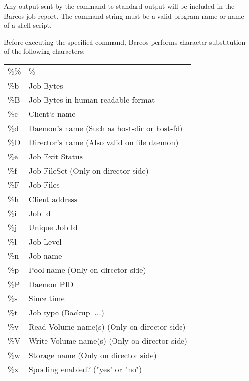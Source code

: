 {Any output sent by the command to standard output will be included in the
Bareos job report.  The command string must be a valid program name or name
of a shell script.


Before executing the specified command, Bareos
performs character substitution of the following characters:

\label{character substitution}
\footnotesize
\begin{longtable}{ l l }
    \%\% & \% \\
    \%b & Job Bytes \\
    \%B & Job Bytes in human readable format \\
    \%c & Client's name \\
    \%d & Daemon's name (Such as host-dir or host-fd) \\
    \%D & Director's name (Also valid on file daemon) \\
    \%e & Job Exit Status \\
    \%f & Job FileSet (Only on director side) \\
    \%F & Job Files \\
    \%h & Client address \\
    \%i & Job Id \\
    \%j & Unique Job Id \\
    \%l & Job Level \\
    \%n & Job name \\
    \%p & Pool name (Only on director side) \\
    \%P & Daemon PID \\
    \%s & Since time \\
    \%t & Job type (Backup, ...) \\
    \%v & Read Volume name(s) (Only on director side) \\
    \%V & Write Volume name(s) (Only on director side) \\
    \%w & Storage name (Only on director side) \\
    \%x & Spooling enabled? ("yes" or "no") \\
\end{longtable}
\normalsize

}
